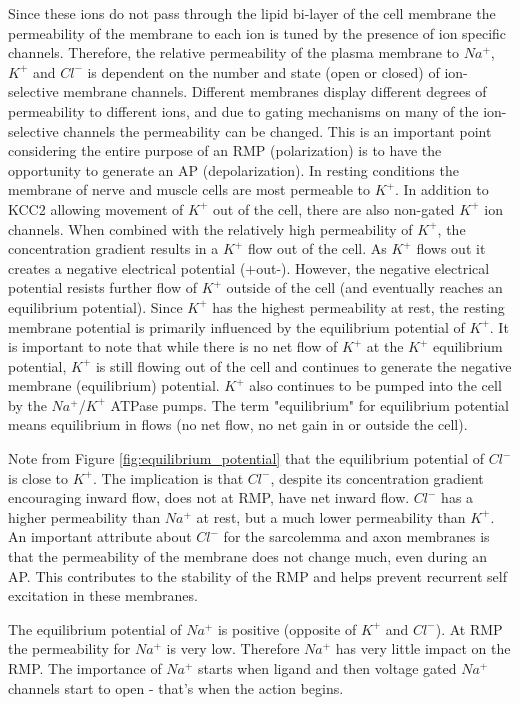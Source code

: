 Since these ions do not pass through the lipid bi-layer of the cell membrane the permeability of the membrane to each ion is tuned by the presence of ion specific channels. Therefore, the relative permeability of the plasma membrane to $Na^+$, $K^+$ and $Cl^-$ is dependent on the number and state (open or closed) of ion-selective membrane channels. Different membranes display different degrees of permeability to different ions, and due to gating mechanisms on many of the ion-selective channels the permeability can be changed. This is an important point considering the entire purpose of an RMP (polarization) is to have the opportunity to generate an AP (depolarization).
\vspace{0.2cm}
In resting conditions the membrane of nerve and muscle cells are most permeable to $K^+$. In addition to KCC2 allowing movement of $K^+$ out of the cell, there are also non-gated $K^+$ ion channels. When combined with the relatively high permeability of $K^+$, the concentration gradient results in a $K^+$ flow out of the cell. As $K^+$ flows out it creates a negative electrical potential (+out-). However, the negative electrical potential resists further flow of $K^+$ outside of the cell (and eventually reaches an equilibrium potential). Since $K^+$ has the highest permeability at rest, the resting membrane potential is primarily influenced by the equilibrium potential of $K^+$. It is important to note that while there is no net flow of $K^+$ at the $K^+$ equilibrium potential, $K^+$ is still flowing out of the cell and continues to generate the negative membrane (equilibrium) potential. $K^+$ also continues to be pumped into the cell by the $Na^+$/$K^+$ ATPase pumps. The term "equilibrium" for equilibrium potential means equilibrium in flows (no net flow, no net gain in or outside the cell).

Note from Figure \ref{fig:equilibrium_potential} that the equilibrium potential of $Cl^-$ is close to $K^+$. The implication is that $Cl^-$, despite its concentration gradient encouraging inward flow, does not at RMP, have net inward flow. $Cl^-$ has a higher permeability than $Na^+$ at rest, but a much lower permeability than $K^+$. An important attribute about $Cl^-$ for the sarcolemma and axon membranes is that the permeability of the membrane does not change much, even during an AP. This contributes to the stability of the RMP and helps prevent recurrent self excitation in these membranes.

The equilibrium potential of $Na^+$ is positive (opposite of $K^+$ and $Cl^-$). At RMP the permeability for $Na^+$ is very low. Therefore $Na^+$ has very little impact on the RMP. The importance of $Na^+$ starts when ligand and then voltage gated $Na^+$ channels start to open - that's when the action begins.

